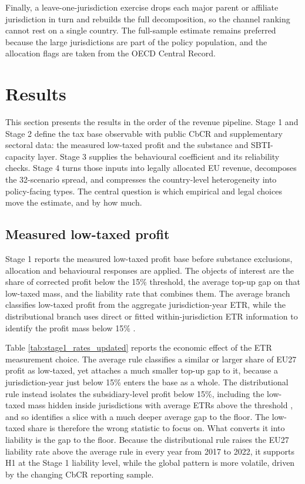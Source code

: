 \documentclass[11pt,a4paper]{article}
\begin{document}
Finally, a leave-one-jurisdiction exercise drops each major parent or affiliate jurisdiction in turn and rebuilds the full decomposition, so the channel ranking cannot rest on a single country. The full-sample estimate remains preferred because the large jurisdictions are part of the policy population, and the allocation flags are taken from the OECD Central Record.

\section{Results}\label{sec:results}\label{sec:se_results}

This section presents the results in the order of the revenue pipeline. Stage 1 and Stage 2 define the tax base observable with public CbCR and supplementary sectoral data: the measured low-taxed profit and the substance and SBTI-capacity layer. Stage 3 supplies the behavioural coefficient and its reliability checks. Stage 4 turns those inputs into legally allocated EU revenue, decomposes the 32-scenario spread, and compresses the country-level heterogeneity into policy-facing types. The central question is which empirical and legal choices move the estimate, and by how much.

\subsection{Measured low-taxed profit}\label{sec:results_stage1}

Stage 1 reports the measured low-taxed profit base before substance exclusions, allocation and behavioural responses are applied. The objects of interest are the share of corrected profit below the 15\% threshold, the average top-up gap on that low-taxed mass, and the liability rate that combines them. The average branch classifies low-taxed profit from the aggregate jurisdiction-year ETR, while the distributional branch uses direct or fitted within-jurisdiction ETR information to identify the profit mass below 15\% \citep{hugger2026}.



Table \ref{tab:stage1_rates_updated} reports the economic effect of the ETR measurement choice. The average rule classifies a similar or larger share of EU27 profit as low-taxed, yet attaches a much smaller top-up gap to it, because a jurisdiction-year just below 15\% enters the base as a whole. The distributional rule instead isolates the subsidiary-level profit below 15\%, including the low-taxed mass hidden inside jurisdictions with average ETRs above the threshold \citep{hugger2026}, and so identifies a slice with a much deeper average gap to the floor. The low-taxed share is therefore the wrong statistic to focus on. What converts it into liability is the gap to the floor. Because the distributional rule raises the EU27 liability rate above the average rule in every year from 2017 to 2022, it supports H1 at the Stage 1 liability level, while the global pattern is more volatile, driven by the changing CbCR reporting sample.
\end{document}
